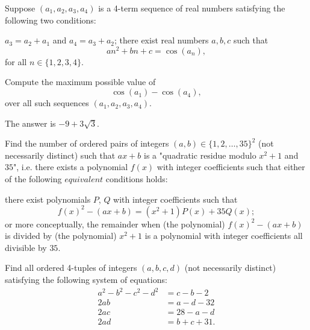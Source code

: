 \documentclass[11pt]{article}
\theoremstyle{definition}
\begin{document}
\begin{question}[name={2015 HMMT, Algebra, \href{https://artofproblemsolving.com/community/c129h1071075p4658510}{Problem 7}}]
	Suppose $(a_1,a_2,a_3,a_4)$ is a 4-term sequence of real numbers satisfying the following two conditions:
	\begin{tasks}
		\task $a_3=a_2+a_1$ and $a_4=a_3+a_2$;
		\task there exist real numbers $a,b,c$ such that\[an^2+bn+c=\cos(a_n),\]for all $n\in\{1,2,3,4\}$.
	\end{tasks}
	Compute the maximum possible value of\[\cos(a_1)-\cos(a_4),\]over all such sequences $(a_1,a_2,a_3,a_4)$.
\end{question}




\begin{solution}
	The answer is $-9+3\sqrt 3$.
\end{solution}


\begin{question}[name={2015 HMMT, Algebra, \href{https://artofproblemsolving.com/community/c129h1071077p4658524}{Problem 8}}]
	Find the number of ordered pairs of integers $(a,b)\in\{1,2,\ldots,35\}^2$ (not necessarily distinct) such that $ax+b$ is a "quadratic residue modulo $x^2+1$ and $35$", i.e. there exists a polynomial $f(x)$ with integer coefficients such that either of the following $\textit{equivalent}$ conditions holds:
	\begin{tasks}
		\task there exist polynomials $P$, $Q$ with integer coefficients such that $$f(x)^2-(ax+b)=(x^2+1)P(x)+35Q(x);$$
		\task or more conceptually, the remainder when (the polynomial) $f(x)^2-(ax+b)$ is divided by (the polynomial) $x^2+1$ is a polynomial with integer coefficients all divisible by $35$.
	\end{tasks}
\end{question}




%	




\begin{question}[name={2015 HMMT, Algebra, \href{https://artofproblemsolving.com/community/c129h1071080p4658534}{Problem 10}}]
	Find all ordered 4-tuples of integers $(a,b,c,d)$ (not necessarily distinct) satisfying the following system of equations:\begin{align*}a^2-b^2-c^2-d^2&=c-b-2\\2ab&=a-d-32\\2ac&=28-a-d\\2ad&=b+c+31.\end{align*}
\end{question}
\end{document}
